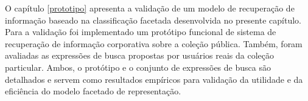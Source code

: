 O capítulo \ref{prototipo} apresenta a validação de um modelo de recuperação de informação baseado na classificação facetada desenvolvida no presente capítulo. Para a validação foi implementado um protótipo funcional de sistema de recuperação de informação corporativa sobre a coleção pública. Também, foram avaliadas as expressões de busca propostas por usuários reais da coleção particular. Ambos, o protótipo e o conjunto de expressões de busca são detalhados e servem como resultados empíricos para validação da utilidade e da eficiência do modelo facetado de representação.









